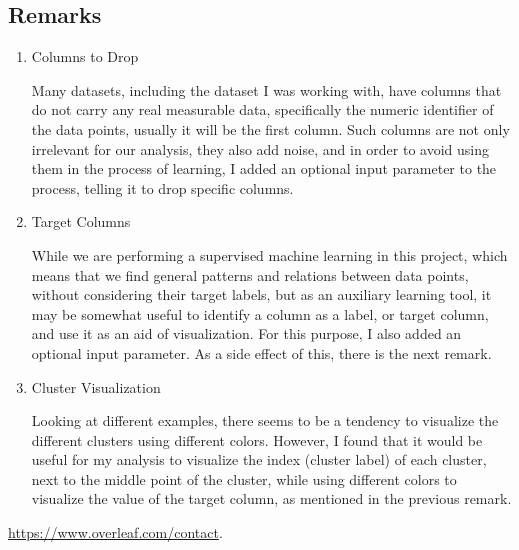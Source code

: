 \documentclass{article}
\begin{document}
\subsection{Remarks}
\begin{enumerate}
    \item Columns to Drop

    Many datasets, including the dataset I was working with, have columns that do not carry any real measurable data, specifically the numeric identifier of the data points, usually it will be the first column. Such columns are not only irrelevant for our analysis, they also add noise, and in order to avoid using them in the process of learning, I added an optional input parameter to the process, telling it to drop specific columns.
    \item Target Columns

    While we are performing a supervised machine learning in this project, which means that we find general patterns and relations between data points, without considering their target labels, but as an auxiliary learning tool, it may be somewhat useful to identify a column as a label, or target column, and use it as an aid of visualization. For this purpose, I also added an optional input parameter. As a side effect of this, there is the next remark.

    \item Cluster Visualization

    Looking at different examples, there seems to be a tendency to visualize the different clusters using different colors. However, I found that it would be useful for my analysis to visualize the index (cluster label) of each cluster, next to the middle point of the cluster, while using different colors to visualize the value of the target column, as mentioned in the previous remark.
\end{enumerate}

\url{https://www.overleaf.com/contact}.



\end{document}
